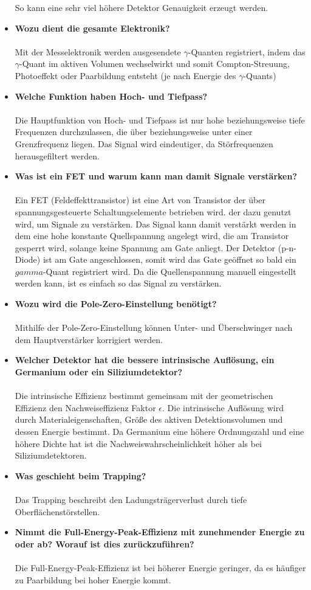 \documentclass{article}
\begin{document}
\begin{itemize}
	So kann eine sehr viel höhere Detektor Genauigkeit erzeugt werden.
	\item \textbf{Wozu dient die gesamte Elektronik?}\\\\
	Mit der Messelektronik werden ausgesendete $\gamma$-Quanten registriert, indem das $\gamma$-Quant im aktiven Volumen wechselwirkt und somit Compton-Streuung, Photoeffekt oder Paarbildung entsteht (je nach Energie des $\gamma$-Quants)
	\item \textbf{Welche Funktion haben Hoch- und Tiefpass?}\\\\
	Die Hauptfunktion von Hoch- und Tiefpass ist nur hohe beziehungsweise tiefe Frequenzen durchzulassen, die über beziehungsweise unter einer Grenzfrequenz liegen. Das Signal wird eindeutiger, da Störfrequenzen herausgefiltert werden.
	\item \textbf{Was ist ein FET und warum kann man damit Signale verstärken?}\\\\
	Ein FET (Feldeffekttransistor) ist eine Art von Transistor der über spannungsgesteuerte Schaltungselemente betrieben wird. der dazu genutzt wird, um Signale zu verstärken. Das Signal kann damit verstärkt werden in dem eine hohe konstante Quellspannung angelegt wird, die am Transistor gesperrt wird, solange keine Spannung am Gate anliegt. Der Detektor (p-n-Diode) ist am Gate angeschlossen, somit wird das Gate geöffnet so bald ein $gamma$-Quant registriert wird. Da die Quellenspannung manuell eingestellt werden kann, ist es einfach so das Signal zu verstärken.
	\item \textbf{Wozu wird die Pole-Zero-Einstellung benötigt?}\\\\
	Mithilfe der Pole-Zero-Einstellung können Unter- und Überschwinger nach dem Hauptverstärker korrigiert werden.
	\item \textbf{Welcher Detektor hat die bessere intrinsische Auflösung, ein Germanium oder ein Siliziumdetektor?}\\\\
	Die intrinsische Effizienz bestimmt gemeinsam mit der geometrischen Effizienz den Nachweiseffizienz Faktor $\epsilon$. Die intrinsische Auflösung wird durch Materialeigenschaften, Größe des aktiven Detektionsvolumen und dessen Energie bestimmt. Da Germanium eine höhere Ordnungszahl und eine höhere Dichte hat ist die Nachweiswahrscheinlichkeit höher als bei Siliziumdetektoren.
	\item \textbf{Was geschieht beim Trapping?}\\\\
	Das Trapping beschreibt den Ladungsträgerverlust durch tiefe Oberflächenstörstellen.
	\item \textbf{Nimmt die Full-Energy-Peak-Effizienz mit zunehmender Energie zu oder ab? Worauf ist dies zurückzuführen?}\\\\
	Die Full-Energy-Peak-Effizienz ist bei höherer Energie geringer, da es häufiger zu Paarbildung bei hoher Energie kommt.
	
	\end{itemize}
\end{document}
